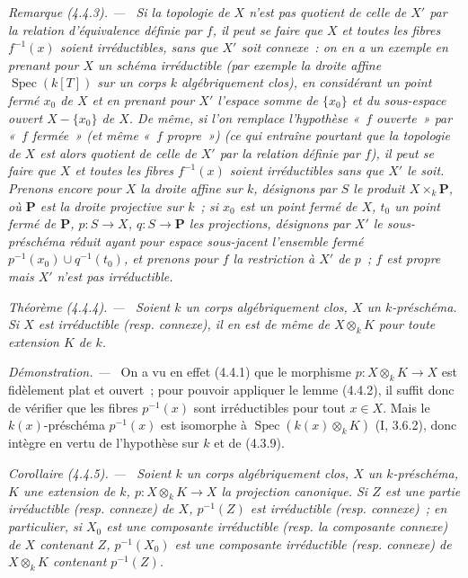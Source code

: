 \documentclass[10pt,oneside]{book}
\newenvironment{theorem}[1][]{%
  \par\medskip\noindent\itshape Théorème (#1). ---\ }{\par}
\newenvironment{corollary}[1][]{%
  \par\medskip\noindent\itshape Corollaire (#1). ---\ }{\par}
\newenvironment{remark}[1][]{%
  \par\medskip\noindent\itshape Remarque (#1). ---\ }{\par}
\newenvironment{proof}{%
  \par\medskip\noindent\textit{Démonstration. ---\ }}{\par}
\begin{document}
\begin{remark}[4.4.3]
\label{IV.2.4.4.3-fr}
Si la topologie de $X$ n'est pas quotient de celle de $X'$ par la relation
d'équivalence définie par $f$, il peut se faire que $X$ et toutes les fibres
$f^{-1}(x)$ soient irréductibles, sans que $X'$ soit connexe~: on en a un
exemple en prenant pour $X$ un schéma irréductible (par exemple la droite
affine $\operatorname{Spec}(k[T])$ sur un corps $k$ algébriquement clos), en
considérant un point fermé $x_0$ de $X$ et en prenant pour $X'$ l'espace
\emph{somme} de $\{x_0\}$ et du sous-espace ouvert $X-\{x_0\}$ de $X$. De
même, si l'on remplace l'hypothèse «~$f$ ouverte~» par «~$f$ fermée~» (et même
«~$f$ propre~») (ce qui entraîne pourtant que la topologie de $X$ est alors
quotient de celle de $X'$ par la relation définie par $f$), il peut se faire
que $X$ et toutes les fibres $f^{-1}(x)$ soient irréductibles sans que $X'$ le
soit. Prenons encore pour $X$ la droite affine sur $k$, désignons par $S$ le
produit $X\times_k\mathbf P$, où $\mathbf P$ est la droite projective sur
$k$~; si $x_0$ est un point fermé de $X$, $t_0$ un point fermé de $\mathbf P$,
$p:S\to X$, $q:S\to\mathbf P$ les projections, désignons par $X'$ le
sous-préschéma réduit ayant pour espace sous-jacent l'ensemble fermé
$p^{-1}(x_0)\cup q^{-1}(t_0)$, et prenons pour $f$ la restriction à $X'$ de
$p$~; $f$ est propre mais $X'$ n'est pas irréductible.
\end{remark}

\begin{theorem}[4.4.4]
\label{IV.2.4.4.4-fr}
Soient $k$ un corps algébriquement clos, $X$ un $k$-préschéma. Si $X$ est
irréductible (resp. connexe), il en est de même de $X\otimes_k K$ pour toute
extension $K$ de $k$.
\end{theorem}

\begin{proof}
On a vu en effet (4.4.1) que le morphisme $p:X\otimes_k K\to X$ est
fidèlement plat et ouvert~; pour pouvoir appliquer le lemme (4.4.2), il suffit
donc de vérifier que les fibres $p^{-1}(x)$ sont irréductibles pour tout
$x\in X$. Mais le $k(x)$-préschéma $p^{-1}(x)$ est isomorphe à
$\operatorname{Spec}(k(x)\otimes_k K)$ (I, 3.6.2), donc intègre en vertu de
l'hypothèse sur $k$ et de (4.3.9).
\end{proof}

\begin{corollary}[4.4.5]
\label{IV.2.4.4.5-fr}
Soient $k$ un corps algébriquement clos, $X$ un $k$-préschéma, $K$ une
extension de $k$, $p:X\otimes_k K\to X$ la projection canonique. Si $Z$ est
une partie irréductible (resp. connexe) de $X$, $p^{-1}(Z)$ est irréductible
(resp. connexe)~; en particulier, si $X_0$ est une composante irréductible
(resp. la composante connexe) de $X$ contenant $Z$, $p^{-1}(X_0)$ est une
composante irréductible (resp. connexe) de $X\otimes_k K$ contenant
$p^{-1}(Z)$.
\end{corollary}
\end{document}
